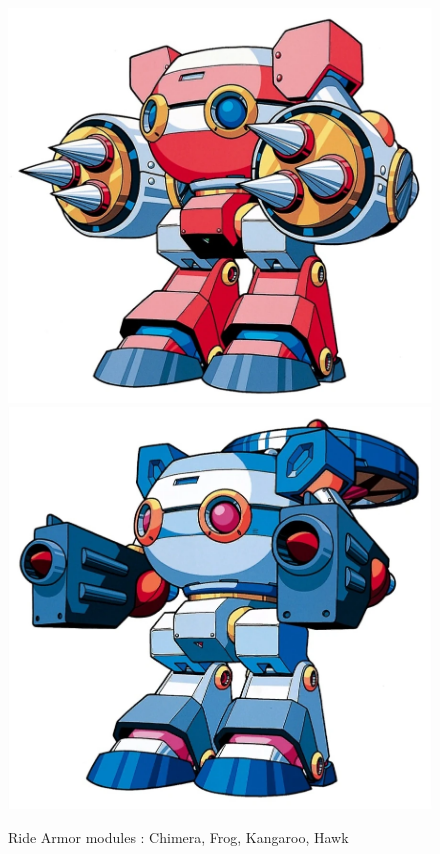 \begin{itemize}
\begin{figure}[htp]
		\vspace{2pt}
		\includegraphics[height=\portraitsize]{figures/X3/weapons/Kangaroo.png}
		\includegraphics[height=\portraitsize]{figures/X3/weapons/Hawk.png}
		\caption{Ride Armor modules : Chimera, Frog, Kangaroo, Hawk}
	\end{figure}
	

\end{itemize}
